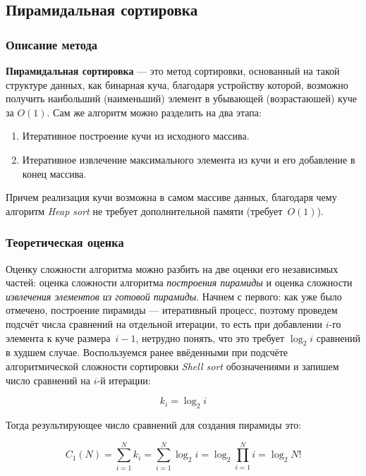 \documentclass[a4paper,12pt,titlepage,finall]{article}
\begin{document}
\subsection{Пирамидальная сортировка}

\subsubsection*{Описание метода} 

\textbf{Пирамидальная сортировка} — это метод сортировки, основанный на такой структуре данных, как бинарная куча, благодаря устройству которой, возможно получить наибольший (наименьший) элемент в убывающей (возрастаюшей) куче за $O(1)$. Сам же алгоритм можно разделить на два этапа:
\begin{enumerate}
\item
Итеративное построение кучи из исходного массива.

\item
Итеративное извлечение максимального элемента из кучи и его добавление в конец массива.
\end{enumerate}

Причем реализация кучи возможна в самом массиве данных, благодаря чему алгоритм \textit{Heap sort} не требует дополнительной памяти (требует~$O(1)$). 

\subsubsection*{Теоретическая оценка} 

Оценку сложности алгоритма можно разбить на две оценки его независимых частей: оценка сложности алгоритма \textit{построения пирамиды} и оценка сложности \textit{извлечения элементов из готовой пирамиды}. Начнем с первого: как уже было отмечено, построение пирамиды — итеративный процесс, поэтому проведем подсчёт числа сравнений на отдельной итерации, то есть при добавлении $i$-го элемента к куче размера~$i-1$, нетрудно понять, что это требует $\log_{2}{i}$ сравнений в худшем случае. Воспользуемся ранее ввёденными при подсчёте алгоритмической сложности сортировки \textit{Shell sort} обозначениями и запишем число сравнений на  $i$-й итерации:

\begin{equation}\label{heap_k_i}
k_i = \log_{2}{i}
\end{equation}

Тогда результирующее число сравнений для создания пирамиды это:

\begin{equation}\label{k1_heap}
C_1(N) = \displaystyle\sum_{i=1}^{N} k_i = \displaystyle\sum_{i=1}^{N} \log_{2}{i} = \log_{2}{\prod\limits_{i = 1}^N i} = \log_{2}{N!}
\end{equation}
\end{document}
